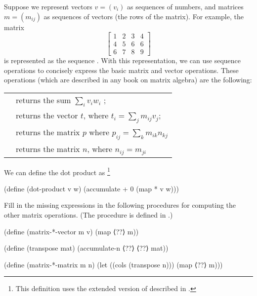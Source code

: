 \begin{exercise}
	\label{Exercise 2.37}
	Suppose we represent vectors \( v = (v_i) \) as sequences of numbers, and matrices \( m = (m_{ij}) \) as sequences of vectors (the rows of the matrix).
	For example, the matrix
	\[
	\begin{bmatrix}
		1 & 2 & 3 & 4 \\
		4 & 5 & 6 & 6 \\
		6 & 7 & 8 & 9
	\end{bmatrix}
	\]
	is represented as the sequence .
	With this representation, we can use sequence operations to concisely express the basic matrix and vector operations.
	These operations (which are described in any book on matrix algebra) are the following:
	\begin{center}
	\begin{tabular}{ll}
		\code{(dot-product v w)}
		&
		returns the sum \( ∑_i v_i w_i \) ;
		\\
		\code{(matrix-*-vector m v)}
		&
		returns the vector \( t \), where \( t_i = ∑_j m_{ij} v_j \);
		\\
		\code{(matrix-*-matrix m n)}
		&
		returns the matrix \( p \) where \( p_{ij} = ∑_k m_{ik} n_{kj} \)
		\\
		\code{(transpose m)}
		&
		returns the matrix \( n \), where \( n_{ij} = m_{ji} \)
	\end{tabular}
	\end{center}
	We can define the dot product as%
	\footnote{
		This definition uses the extended version of  described in .
	}
	\begin{scheme}
	  (define (dot-product v w)
	    (accumulate + 0 (map * v w)))
	\end{scheme}
	Fill in the missing expressions in the following procedures for computing the other matrix operations.
	(The procedure  is defined in .)
	\begin{scheme}
	  (define (matrix-*-vector m v)
	    (map ⟨??⟩ m))

	  (define (transpose mat)
	    (accumulate-n ⟨??⟩ ⟨??⟩ mat))

	  (define (matrix-*-matrix m n)
	    (let ((cols (transpose n)))
	      (map ⟨??⟩ m)))
	\end{scheme}
\end{exercise}




